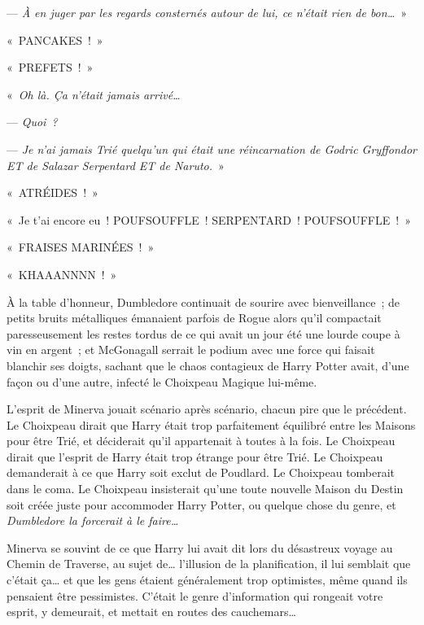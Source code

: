 --- \emph{À en juger par les regards consternés autour de lui, ce n'était rien de bon…}~»

\later

«~PANCAKES~!~»

\later

«~PREFETS~!~»

\later

«~\emph{Oh là. Ça n'était jamais arrivé…}

--- \emph{Quoi~?}

--- \emph{Je n'ai jamais Trié quelqu'un qui était une réincarnation de Godric Gryffondor ET de Salazar Serpentard ET de Naruto.}~»

\later

«~ATRÉIDES~!~»

\later

«~Je t'ai encore eu~! POUFSOUFFLE~! SERPENTARD~! POUFSOUFFLE~!~»

\later

«~FRAISES MARINÉES~!~»

\later

«~KHAAANNNN~!~»

\later

À la table d'honneur, Dumbledore continuait de sourire avec bienveillance~; de petits bruits métalliques émanaient parfois de Rogue alors qu'il compactait paresseusement les restes tordus de ce qui avait un jour été une lourde coupe à vin en argent~; et McGonagall serrait le podium avec une force qui faisait blanchir ses doigts, sachant que le chaos contagieux de Harry Potter avait, d'une façon ou d'une autre, infecté le Choixpeau Magique lui-même.

L'esprit de Minerva jouait scénario après scénario, chacun pire que le précédent. Le Choixpeau dirait que Harry était trop parfaitement équilibré entre les Maisons pour être Trié, et déciderait qu'il appartenait à toutes à la fois. Le Choixpeau dirait que l'esprit de Harry était trop étrange pour être Trié. Le Choixpeau demanderait à ce que Harry soit exclut de Poudlard. Le Choixpeau tomberait dans le coma. Le Choixpeau insisterait qu'une toute nouvelle Maison du Destin soit créée juste pour accommoder Harry Potter, ou quelque chose du genre, et \emph{Dumbledore la forcerait à le faire…}

Minerva se souvint de ce que Harry lui avait dit lors du désastreux voyage au Chemin de Traverse, au sujet de… l'illusion de la planification, il lui semblait que c'était ça… et que les gens étaient généralement trop optimistes, même quand ils pensaient être pessimistes. C'était le genre d'information qui rongeait votre esprit, y demeurait, et mettait en routes des cauchemars…

